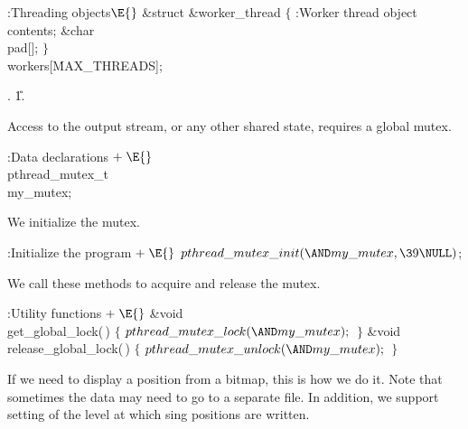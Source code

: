 \Y\B\4:Threading objects\X${}\E{}$\6
\&{struct} \&{worker\_thread} ${}\{{}$\1\6
:Worker thread object contents\X;\7
\&{char} \\{pad}[];\2\6
${}\}{}$ \\{workers}[\.{MAX\_THREADS}];\par
{}.
\U1.\fi

Access to the output stream, or any other shared state, requires
a global mutex.

\Y\B\4:Data declarations\X${}\mathrel+\E{}$\6
\\{pthread\_mutex\_t}\\{my\_mutex};\par
\fi

We initialize the mutex.

\Y\B\4:Initialize the program\X${}\mathrel+\E{}$\6
$\\{pthread\_mutex\_init}({\AND}\\{my\_mutex},\39\NULL){}$;\par
\fi

We call these methods to acquire and release the mutex.

\Y\B\4:Utility functions\X${}\mathrel+\E{}$\6
\&{void} \\{get\_global\_lock}(\,)\1\1\2\2\6
${}\{{}$\1\6
${}\\{pthread\_mutex\_lock}({\AND}\\{my\_mutex});{}$\6
\4${}\}{}$\2\7
\&{void} \\{release\_global\_lock}(\,)\1\1\2\2\6
${}\{{}$\1\6
${}\\{pthread\_mutex\_unlock}({\AND}\\{my\_mutex});{}$\6
\4${}\}{}$\2\par
\fi

If we need to display a position from a bitmap, this is
how we do it.  Note that sometimes the data may need to go
to a separate file.  In addition, we support setting of the
level at which sing positions are written.

